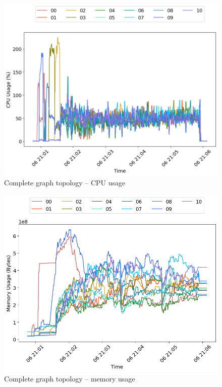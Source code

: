 \begin{minipage}{0.5\linewidth}
\begin{figure}[H]
\captionsetup{justification=centering,width=0.8\linewidth}
\includegraphics[width=\linewidth]{figures/graph-complete/cpu_usage.png}
\caption{Complete graph topology -- CPU usage}
\label{fig:graph-complete-blk_read}
\end{figure}
\end{minipage}
\begin{minipage}{0.5\linewidth}
\begin{figure}[H]
\captionsetup{justification=centering,width=0.8\linewidth}
\includegraphics[width=\linewidth]{figures/graph-complete/mem_usage.png}
\caption{Complete graph topology -- memory usage}
\label{fig:graph-complete-blk_write}
\end{figure}
\end{minipage}


